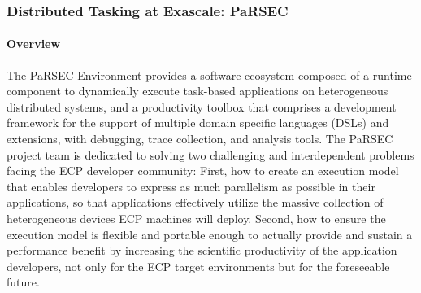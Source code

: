 \subsubsection{ Distributed Tasking at Exascale: PaRSEC}


\paragraph{Overview}

The PaRSEC Environment provides a software ecosystem composed of a runtime
component to dynamically execute task-based applications on heterogeneous
distributed systems, and a productivity toolbox that comprises a development
framework for the support of multiple domain specific languages (DSLs) and
extensions, with debugging, trace collection, and analysis tools.
%
The PaRSEC project team is dedicated to solving two challenging and
interdependent problems facing the ECP developer community: First, how to create
an execution model that enables developers to express as much parallelism as
possible in their applications, so that applications effectively utilize the
massive collection of heterogeneous devices ECP machines will deploy. Second,
how to ensure the execution model is flexible and portable enough to actually
provide and sustain a performance benefit by increasing the scientific
productivity of the application developers, not only for the ECP target
environments but for the foreseeable future.

